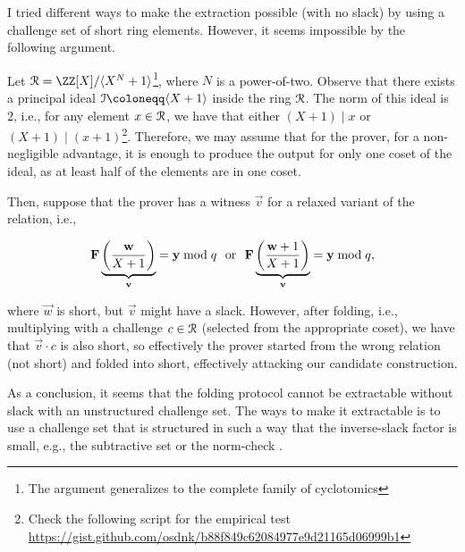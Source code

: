 I tried different ways to make the extraction possible (with no slack) by using a challenge set of short ring elements. However, it seems impossible by the following argument. 

Let $\ring = \ZZ[X] / \langle X^N + 1 \rangle$\footnote{The argument generalizes to the complete family of cyclotomics}, where $N$ is a power-of-two. Observe that there exists a principal ideal $\mathcal{I} \defeq \langle X + 1 \rangle$ inside the ring $\mathcal{R}$. The norm of this ideal is $2$, i.e., for any element $x \in \mathcal{R}$, we have that either $(X + 1) \mid x$ or $(X + 1) \mid (x+1)$\footnote{Check the following script for the empirical test \url{https://gist.github.com/osdnk/b88f849c62084977e9d21165d06999b1}}. Therefore, we may assume that for the prover, for a non-negligible advantage, it is enough to produce the output for only one coset of the ideal, as at least half of the elements are in one coset.

Then, suppose that the prover has a witness $\vec{v}$ for a relaxed variant of the relation, i.e., 

\[ \mathbf{F} \underbrace{\left( \frac{{{\mathbf{w}}}}{X + 1} \right)}_{{{\mathbf{v}}}}  = {{\mathbf{y}}} \bmod q ~~\text{or}~~ \mathbf{F} \underbrace{\left( \frac{{{\mathbf{w}}} + 1}{X + 1} \right)}_{{{\mathbf{v}}}} = {{\mathbf{y}}} \bmod q, \]

where $\vec{w}$ is short, but $\vec{v}$ might have a slack. However, after folding, i.e., multiplying with a challenge $c \in \mathcal{R}$ (selected from the appropriate coset), we have that $\vec{v} \cdot c$ is also short, so effectively the prover started from the wrong relation (not short) and folded into short, effectively attacking our candidate construction. 


As a conclusion, it seems that the folding protocol cannot be extractable without slack with an unstructured challenge set. The ways to make it extractable is to use a challenge set that is structured in such a way that the inverse-slack factor is small, e.g., the subtractive set \cite{C:AlbLai21,C:CinLaiMal23,EPRINT:BonChe24} or the norm-check \cite{RR,EPRINT:BonChe25}.